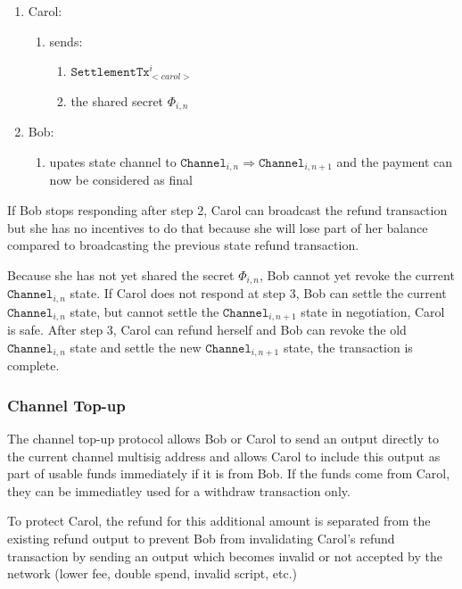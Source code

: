 \documentclass{llncs}
\begin{document}
\begin{enumerate}
\begin{enumerate}
\begin{enumerate}
    \end{enumerate}
  \end{enumerate}
\item Carol:
  \begin{enumerate}
  \item sends:
    \begin{enumerate}
    \item $\texttt{SettlementTx}_{<carol>}^{i}$
    \item the shared secret $\Phi_{i,n}$
    \end{enumerate}
  \end{enumerate}
\item Bob:
  \begin{enumerate}
  \item upates state channel to $\texttt{Channel}_{i,n} \Rightarrow
\texttt{Channel}_{i,n+1}$ and the payment can now be considered as final
  \end{enumerate}
\end{enumerate}

If Bob stops responding after step 2, Carol can broadcast the refund transaction
but she has no incentives to do that because she will lose part of her balance
compared to broadcasting the previous state refund transaction.

Because she has not yet shared the secret $\Phi_{i,n}$, Bob cannot yet revoke
the current $\texttt{Channel}_{i,n}$ state. If Carol does not respond at step 3,
Bob can settle the current $\texttt{Channel}_{i,n}$ state, but cannot settle the
$\texttt{Channel}_{i,n+1}$ state in negotiation, Carol is safe. After step 3,
Carol can refund herself and Bob can revoke the old $\texttt{Channel}_{i,n}$
state and settle the new $\texttt{Channel}_{i,n+1}$ state, the transaction is
complete.

\subsubsection{Channel Top-up} The channel top-up protocol allows Bob or Carol
to send an output directly to the current channel multisig address and allows
Carol to include this output as part of usable funds immediately if it is from
Bob. If the funds come from Carol, they can be immediatley used for a withdraw
transaction only.

To protect Carol, the refund for this additional amount is separated from the
existing refund output to prevent Bob from invalidating Carol's refund
transaction by sending an output which becomes invalid or not accepted by the
network (lower fee, double spend, invalid script, etc.)
\end{document}
